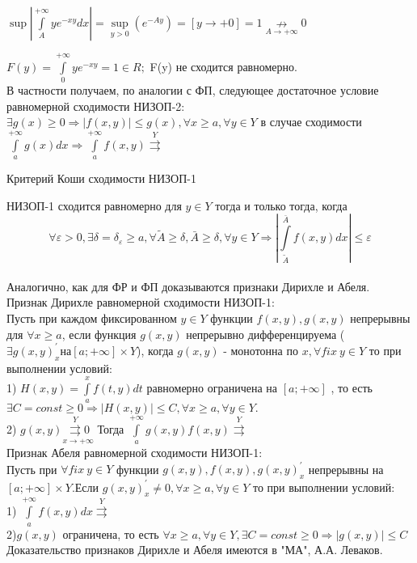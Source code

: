 \documentclass[a4paper,12pt,openany]{report}
\begin{document}
$\sup\left| \int\limits_A^{+\infty}ye^{-xy}dx \right|=\underset{y > 0}\sup  \left( e^{-Ay}\right) = \left[y \to +0\right] = 1 \underset{A \to +\infty}\nrightarrow 0 $		

$F(y) = \int\limits_0^{+\infty}ye^{-xy} = 1 \in R;$ F(y) не сходится равномерно.
\\
В частности получаем, по аналогии с ФП, следующее достаточное условие равномерной сходимости НИЗОП-2:
$\exists g(x) \ge 0 \Rightarrow \left| f(x,y) \right| \le g(x), \forall x \ge a, \forall y \in Y $ в случае сходимости $\int\limits_a^{+\infty}g(x)dx \Rightarrow \int\limits_a^{+\infty}f(x,y) \overset{Y}\rightrightarrows $
\begin{crl*}Критерий Коши сходимости НИЗОП-1\end{crl*}

НИЗОП-1 сходится равномерно для $ y \in Y$ тогда и только тогда, когда\begin{equation}\label{lec10:11} \forall \varepsilon > 0, \exists \delta = \delta_\varepsilon \ge a, \forall \tilde{A} \ge \delta, \bar{A} \ge \delta, \forall y \in Y \Rightarrow \left| \int\limits_{\tilde{A}}^{\bar{A}}f(x,y)dx \right| \le \varepsilon \end{equation}
\\
Аналогично, как для ФР и ФП доказываются признаки Дирихле и Абеля.
\\
Признак Дирихле равномерной сходимости НИЗОП-1:
\\
Пусть при каждом фиксированном $y \in Y$ функции $f(x,y),g(x,y)$ непрерывны для $\forall x \ge a$, если функция $g(x,y)$ непрерывно дифференцируема ($\exists g(x,y)_x^\prime на [a;+\infty] \times Y $), когда $g(x,y)$ - монотонна по $x, \forall fix \ y \in Y$ то при выполнении условий:
\\
1) $H(x,y) = \int\limits_a^x f(t,y)dt$ равномерно ограничена на $[a;+\infty]$ , то  есть $\exists C = const \ge 0 \Rightarrow \left|H(x,y)\right| \le C, \forall x \ge a, \forall y \in Y.$
\\
2) $g(x,y)\underset{x \to +\infty}{\overset{Y}{\rightrightarrows} 0}$
Тогда $\int\limits_a^{+\infty} g(x,y)f(x,y) \overset{Y}{\rightrightarrows}$
\\
Признак Абеля равномерной сходимости НИЗОП-1:
\\
Пусть при $\forall fix \ y \in Y $ функции $g(x,y), f(x,y), g(x,y)_x^\prime$ непрерывны на $[a;+\infty]\times Y.$Если $ g(x,y)_x^\prime \not = 0, \forall x \ge a, \forall y \in Y $ то при выполнении условий:
\\
1) $\int\limits_a^{+\infty}f(x,y)dx \overset{Y}{\rightrightarrows}$
\\
2)$g(x,y)$ ограничена, то есть $\forall x \ge a, \forall y \in Y, \exists C = const \ge 0 \Rightarrow \left|g(x,y)\right| \le C $
\\
Доказательство признаков Дирихле и Абеля имеются в "МА", А.А. Леваков.
\\
\\
\\
\end{document}
